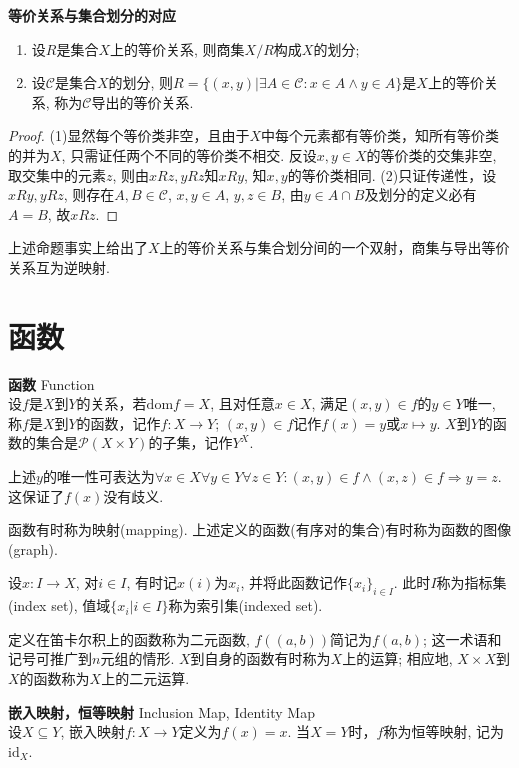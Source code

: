 \begin{pro}\textbf{等价关系与集合划分的对应}\\
\begin{enumerate}
\item 设$R$是集合$X$上的等价关系, 则商集$X/R$构成$X$的划分; 
\item 设$\mathcal{C}$是集合$X$的划分, 则$R=\{(x,y)\vert \exists A\in \mathcal{C}: x\in A \land y \in A\}$是$X$上的等价关系, 称为$\mathcal{C}$导出的等价关系. 
\end{enumerate}
\end{pro}
\begin{proof}
(1)显然每个等价类非空，且由于$X$中每个元素都有等价类，知所有等价类的并为$X$, 只需证任两个不同的等价类不相交. 反设$x,y\in X$的等价类的交集非空, 取交集中的元素$z$, 则由$xRz, yRz$知$xRy$, 知$x,y$的等价类相同. (2)只证传递性，设$xRy,yRz$, 则存在$A,B\in \mathcal{C}$, $x,y\in A$, $y,z\in B$, 由$y\in A\cap B$及划分的定义必有$A=B$, 故$xRz$.
\end{proof}
上述命题事实上给出了$X$上的等价关系与集合划分间的一个双射，商集与导出等价关系互为逆映射.

\section{函数}

\begin{dfn} \textbf{函数} Function\\
设$f$是$X$到$Y$的关系，若$\mathrm{dom}f=X$, 且对任意$x\in X$, 满足$(x,y)\in f$的$y\in Y$唯一, 称$f$是$X$到$Y$的函数，记作$f: X\to Y$; $(x,y)\in f$记作$f(x)=y$或$x\mapsto y$. $X$到$Y$的函数的集合是$\mathcal{P}(X\times Y)$的子集，记作$Y^X$.
\end{dfn}
上述$y$的唯一性可表达为$\forall x\in X \forall y\in Y\forall z\in Y: (x,y)\in f \land (x,z) \in f \Rightarrow y=z$. 这保证了$f(x)$没有歧义. 
\par 函数有时称为映射(mapping). 上述定义的函数(有序对的集合)有时称为函数的图像(graph). 
\par 设$x: I\to X$, 对$i\in I$, 有时记$x(i)$为$x_i$, 并将此函数记作$\{x_i\}_{i\in I}$. 此时$I$称为指标集(index set), 值域$\{x_i\vert i\in I\}$称为索引集(indexed set). 
\par 定义在笛卡尔积上的函数称为二元函数, $f((a,b))$简记为$f(a,b)$; 这一术语和记号可推广到$n$元组的情形. $X$到自身的函数有时称为$X$上的运算; 相应地, $X\times X$到$X$的函数称为$X$上的二元运算. 

\begin{dfn} \textbf{嵌入映射，恒等映射} Inclusion Map, Identity Map\\
设$X\subseteq Y$, 嵌入映射$f:X\to Y$定义为$f(x)=x$. 当$X=Y$时，$f$称为恒等映射, 记为${\mathrm{id}}_{X}$. 
\end{dfn}

